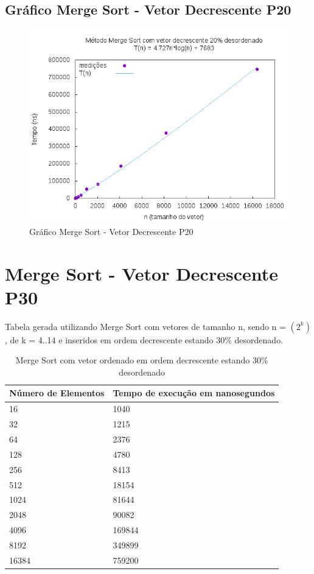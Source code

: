 \documentclass[12pt,a4paper,twoside]{report}
\begin{document}
\subsection{Gráfico Merge Sort - Vetor Decrescente P20}
\begin{figure}[H]
    \centering
    \includegraphics[width=0.7\linewidth]{graficos/MergeSort/vIntDecrescenteP20/vIntDecrescenteP20.png}
  \caption{Gráfico Merge Sort - Vetor Decrescente P20}
\end{figure}

\section{Merge Sort - Vetor Decrescente P30}
Tabela gerada utilizando Merge Sort com vetores de tamanho n, sendo n = $(2^k)$, de k = 4..14 e inseridos em ordem decrescente estando 30\% desordenado.
\begin{table}[H]
\centering
\caption{Merge Sort com vetor ordenado em ordem decrescente estando 30\% desordenado}
\label{my-label}
\begin{tabular}{|l|l|}
\hline
\multicolumn{1}{|c|}{\textbf{Número de Elementos}} & \multicolumn{1}{c|}{\textbf{Tempo de execução em nanosegundos}} \\ \hline
16 & 1040 \\ \hline
32 & 1215 \\ \hline
64 & 2376 \\ \hline
128 & 4780 \\ \hline
256 & 8413 \\ \hline
512 & 18154 \\ \hline
1024 & 81644 \\ \hline
2048 & 90082 \\ \hline
4096 & 169844 \\ \hline
8192 & 349899 \\ \hline
16384 & 759200 \\ \hline
\end{tabular}
\end{table}
\end{document}

